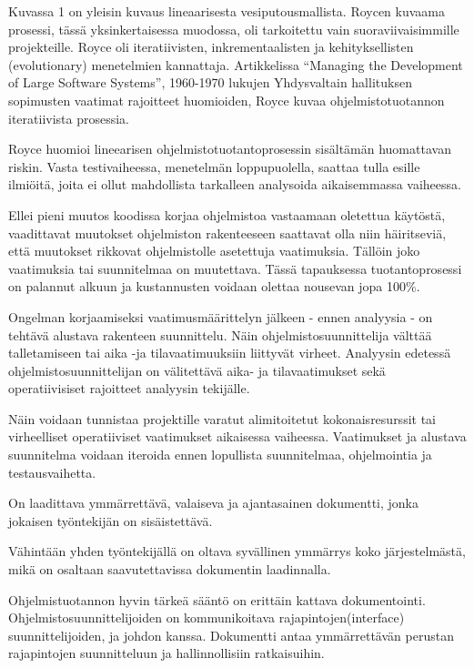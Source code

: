 \documentclass[finnish]{tktltiki2}
\theoremstyle{definition}
\theoremstyle{remark}
\begin{document}
Kuvassa 1 on yleisin kuvaus lineaarisesta vesiputousmallista. Roycen kuvaama prosessi, tässä yksinkertaisessa muodossa, oli tarkoitettu vain suoraviivaisimmille projekteille. Royce oli iteratiivisten, inkrementaalisten ja kehityksellisten (evolutionary) menetelmien kannattaja. Artikkelissa “Managing the Development of Large Software Systems”, 1960-1970 lukujen Yhdysvaltain hallituksen sopimusten vaatimat rajoitteet huomioiden, Royce kuvaa ohjelmistotuotannon iteratiivista prosessia\cite{LAB03}. 

Royce huomioi lineearisen ohjelmistotuotantoprosessin sisältämän huomattavan riskin. Vasta testivaiheessa, menetelmän loppupuolella, saattaa tulla esille ilmiöitä, joita ei ollut mahdollista tarkalleen analysoida aikaisemmassa vaiheessa\cite{ROY70}.

Ellei pieni muutos koodissa korjaa ohjelmistoa vastaamaan oletettua käytöstä, vaadittavat muutokset ohjelmiston rakenteeseen saattavat olla niin häiritseviä, että muutokset rikkovat ohjelmistolle asetettuja vaatimuksia. Tällöin joko vaatimuksia tai suunnitelmaa on muutettava. Tässä tapauksessa tuotantoprosessi on palannut alkuun ja kustannusten voidaan olettaa nousevan jopa 100\%\cite{ROY70}.

Ongelman korjaamiseksi vaatimusmäärittelyn jälkeen - ennen analyysia - on tehtävä alustava rakenteen suunnittelu. Näin ohjelmistosuunnittelija välttää talletamiseen tai aika -ja tilavaatimuuksiin liittyvät virheet. Analyysin edetessä ohjelmistosuunnittelijan on välitettävä aika- ja tilavaatimukset sekä operatiivisiset rajoitteet analyysin tekijälle\cite{ROY70}.

Näin voidaan tunnistaa projektille varatut alimitoitetut kokonaisresurssit tai virheelliset operatiiviset vaatimukset aikaisessa vaiheessa. Vaatimukset ja alustava suunnitelma voidaan iteroida ennen lopullista suunnitelmaa, ohjelmointia ja testausvaihetta\cite{ROY70}.

On laadittava ymmärrettävä, valaiseva ja ajantasainen dokumentti, jonka jokaisen työntekijän on sisäistettävä\cite{ROY70}.

Vähintään yhden työntekijällä on oltava syvällinen ymmärrys koko järjestelmästä, mikä on osaltaan saavutettavissa dokumentin laadinnalla\cite{ROY70}.

Ohjelmistuotannon hyvin tärkeä sääntö on erittäin kattava dokumentointi. Ohjelmistosuunnittelijoiden on kommunikoitava rajapintojen(interface) suunnittelijoiden, ja johdon kanssa. Dokumentti antaa ymmärrettävän perustan rajapintojen suunnitteluun ja hallinnollisiin ratkaisuihin\cite{ROY70}.
\end{document}
